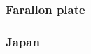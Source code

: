 \cite{jabi12}
\cite{jabr13}
\cite{haja17}
\cite{mimo18}

\subsubsection*{Farallon plate} 

\cite{lisg08}

\subsubsection*{Japan} 

\cite{kigk14}


